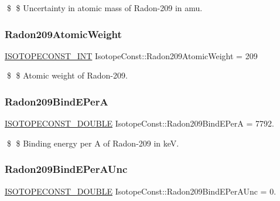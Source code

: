 \$ \$ Uncertainty in atomic mass of Radon-\/209 in amu. \mbox{\label{group___isotope_const-_radon-_rn209_ga4e85490782e032f678703f59d1fb11f9}} 
\subsubsection{\texorpdfstring{Radon209\+Atomic\+Weight}{Radon209AtomicWeight}}
{\footnotesize\ttfamily \mbox{\hyperlink{group___isotope_const-_macros_ga5f18360b3e99483a35c32d789e62621c}{I\+S\+O\+T\+O\+P\+E\+C\+O\+N\+S\+T\+\_\+\+I\+NT}} Isotope\+Const\+::\+Radon209\+Atomic\+Weight = 209}

\$ \$ Atomic weight of Radon-\/209. \mbox{\label{group___isotope_const-_radon-_rn209_gab93af3ad08dbbad5a510621d68131ae2}} 
\subsubsection{\texorpdfstring{Radon209\+Bind\+E\+PerA}{Radon209BindEPerA}}
{\footnotesize\ttfamily \mbox{\hyperlink{group___isotope_const-_macros_ga8f45a7272ce02c0b4c65c44636ed719a}{I\+S\+O\+T\+O\+P\+E\+C\+O\+N\+S\+T\+\_\+\+D\+O\+U\+B\+LE}} Isotope\+Const\+::\+Radon209\+Bind\+E\+PerA = 7792.}

\$ \$ Binding energy per A of Radon-\/209 in keV. \mbox{\label{group___isotope_const-_radon-_rn209_ga690e739b47eca20a10fb41c60c5db056}} 
\subsubsection{\texorpdfstring{Radon209\+Bind\+E\+Per\+A\+Unc}{Radon209BindEPerAUnc}}
{\footnotesize\ttfamily \mbox{\hyperlink{group___isotope_const-_macros_ga8f45a7272ce02c0b4c65c44636ed719a}{I\+S\+O\+T\+O\+P\+E\+C\+O\+N\+S\+T\+\_\+\+D\+O\+U\+B\+LE}} Isotope\+Const\+::\+Radon209\+Bind\+E\+Per\+A\+Unc = 0.}


